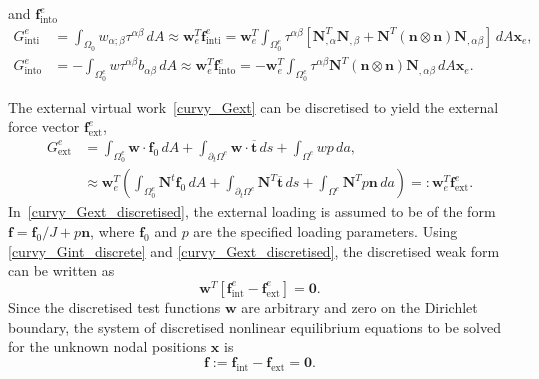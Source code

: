 \documentclass[../main.tex]{subfiles}
\begin{document}
 and $\mathbf{f}^{e}_{\text{into}}$
\begin{align} \label{curvy_Gint_decomposed_discretised}
    G_{\text{inti}}^{e} &= \int_{\Omega_{0}} w_{\alpha;\beta} \tau^{\alpha \beta}\,dA \approx \mathbf{w}_{e}^{T} \mathbf{f}^{e}_{\text{inti}} = \mathbf{w}_{e}^{T} \int_{\Omega_{0}^{e}} \tau^{\alpha \beta}
    \left[ \mathbf{N}_{, \alpha}^{T} \mathbf{N}_{, \beta} + \mathbf{N}^{T} \left( \boldsymbol{n} \otimes \boldsymbol{n} \right) \mathbf{N}_{, \alpha \beta} \right]\,dA \mathbf{x}_{e},\\
    G_{\text{into}}^{e} &= -\int_{\Omega_{0}^{e}} w \tau^{\alpha \beta} b_{\alpha \beta}\,dA 
    \approx \mathbf{w}_{e}^{T} \mathbf{f}^{e}_{\text{into}} = - \mathbf{w}_{e}^{T}\int_{\Omega_{0}^{e}} \tau^{\alpha \beta}\mathbf{N}^{T} \left( \boldsymbol{n} \otimes \boldsymbol{n} \right) \mathbf{N}_{, \alpha \beta}\,dA \mathbf{x}_{e}.
\end{align}

The external virtual work~\eqref{curvy_Gext} can be discretised to yield the external force vector $\mathbf{f}^{e}_{\text{ext}}$, 
\begin{equation}\label{curvy_Gext_discretised}
    \begin{split}
        G_{\text{ext}}^{e} &= \int_{\Omega_{0}^{e}} \boldsymbol{w} \cdot \boldsymbol{f}_{0}\,dA + \int_{\partial_{t}\Omega^{e}} \boldsymbol{w}\cdot \overline{\boldsymbol{t}}\,ds + \int_{\Omega^{e}} wp \,da,\\
        &\approx \mathbf{w}^{T}_{e} \left(\int_{\Omega_{0}^{e}} \mathbf{N}^{t} \boldsymbol{f}_{0} \,dA + \int_{\partial_{t} \Omega^{e}} \mathbf{N}^{T} \overline{\boldsymbol{t}}\,ds + \int_{\Omega^{e}} \mathbf{N}^{T} p \boldsymbol{n} \,da \right) =: \mathbf{w}^{T}_{e} \mathbf{f}^{e}_{\text{ext}}.
    \end{split}
\end{equation}
In~\eqref{curvy_Gext_discretised}, the external loading is assumed to be of the form $\boldsymbol{f} = \boldsymbol{f}_{0}/J + p\boldsymbol{n}$, where $\boldsymbol{f}_{0}$ and $p$ are the specified loading parameters. 
Using \eqref{curvy_Gint_discrete} and \eqref{curvy_Gext_discretised}, the discretised weak form can be written as
\begin{equation} \label{curvy_weak_form_discretised}
    \mathbf{w}^{T}\left[\mathbf{f}^{e}_{\text{int}} - \mathbf{f}^{e}_{\text{ext}}\right] = \boldsymbol{0}.
\end{equation}
Since the discretised test functions $\mathbf{w}$ are arbitrary and zero on the Dirichlet boundary, the system of discretised nonlinear equilibrium equations
 to be solved for the unknown nodal positions $\mathbf{x}$ is
 \begin{equation} \label{curvy_f_system}
    \mathbf{f} := \mathbf{f}_{\text{int}} - \mathbf{f}_{\text{ext}} = \boldsymbol{0}.
 \end{equation} 
\end{document}
